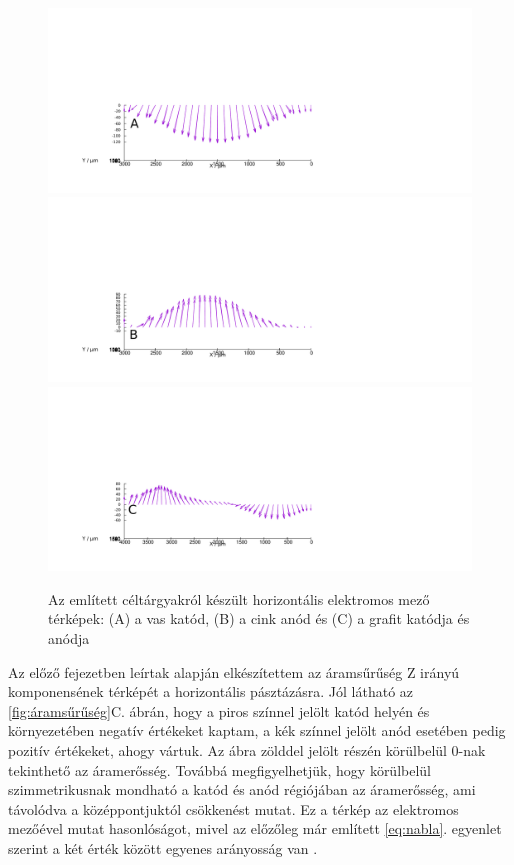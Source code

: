 \begin{figure}
\centering
\includegraphics[width=1.2\textwidth]{img/mérések/Fe_h100.pdf}
\includegraphics[width=1.2\textwidth]{img/mérések/Zn_h100.pdf}
\includegraphics[width=1.2\textwidth]{img/mérések/grafit_h100.pdf}

\caption{Az említett céltárgyakról készült horizontális elektromos mező térképek:
(A) a vas katód, (B) a cink anód és (C) a grafit katódja és anódja}
\label{fig:field_h}
\end{figure}


Az előző fejezetben leírtak alapján elkészítettem az áramsűrűség Z irányú komponensének térképét a horizontális pásztázásra. Jól látható az \ref{fig:áramsűrűség}C. ábrán, hogy a piros színnel jelölt katód helyén és környezetében negatív értékeket kaptam, a kék színnel jelölt anód esetében pedig pozitív értékeket, ahogy vártuk. Az ábra zölddel jelölt részén körülbelül 0-nak tekinthető az áramerősség. Továbbá megfigyelhetjük, hogy körülbelül szimmetrikusnak mondható a katód és anód régiójában az áramerősség, ami távolódva a középpontjuktól csökkenést mutat. Ez a térkép az elektromos mezőével mutat hasonlóságot, mivel az előzőleg már említett \ref{eq:nabla}. egyenlet szerint a két érték között egyenes arányosság van \cite{isaacs1981scanning,bastos2017application}.


